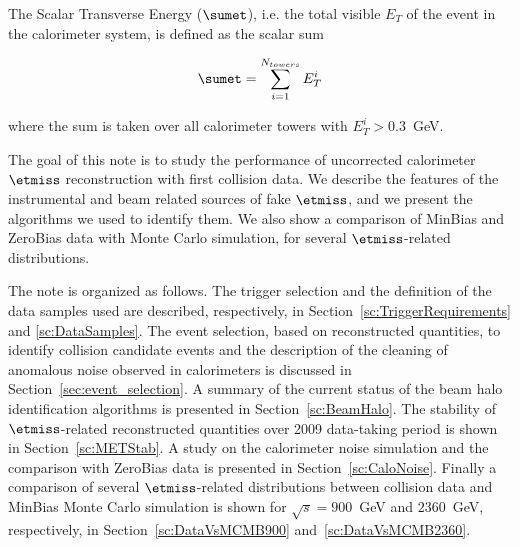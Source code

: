 The Scalar Transverse Energy ($\sumet$), i.e. the total visible 
$E_T$ of the event in the calorimeter system, 
is defined as the scalar sum 

\begin{align}
  \label{eq:34}
  \sumet = \sum\limits^{N_{towers}}_{i=1}E_T^i
\end{align}

where the sum is taken over all calorimeter towers with $E_T^i>0.3$~GeV.

The goal of this note is to study the performance of uncorrected 
calorimeter $\etmiss$ reconstruction with first collision data. 
We describe the features of the instrumental 
and beam related sources of fake $\etmiss$, and we present the algorithms we used to identify them.
We also show a comparison of MinBias and ZeroBias data with Monte Carlo simulation, for several 
$\etmiss$-related distributions.

The note is organized as follows.
The trigger selection and the definition of the data samples used are described,
respectively, in Section~\ref{sc:TriggerRequirements} and \ref{sc:DataSamples}. 
The event selection, based on reconstructed quantities, to identify collision candidate 
events and the description of the cleaning of anomalous noise observed in calorimeters 
is discussed in Section~\ref{sec:event_selection}.
A summary of the current status of the beam halo identification algorithms 
is presented in Section~\ref{sc:BeamHalo}.
The stability of $\etmiss$-related reconstructed quantities over 2009 
data-taking period is shown in Section~\ref{sc:METStab}.
A study on the calorimeter noise simulation and the comparison 
with ZeroBias data is presented in Section~\ref{sc:CaloNoise}.
Finally a comparison of several $\etmiss$-related distributions
between collision data and MinBias Monte Carlo simulation 
is shown for $\sqrt{s}=900$~GeV and $2360$~GeV, respectively, in 
Section~\ref{sc:DataVsMCMB900} and~\ref{sc:DataVsMCMB2360}.
